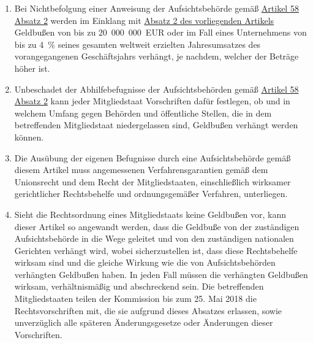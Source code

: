 \begin{enumerate}
\begin{enumerate}
  \end{enumerate}

  \item Bei Nichtbefolgung einer Anweisung der Aufsichtsbehörde gemäß \hyperref[itm:58-2]{Artikel 58 Absatz 2} werden im
   Einklang mit \hyperref[itm:83-2]{Absatz 2 des vorliegenden Artikels} Geldbußen von bis zu 20~000~000~EUR oder im
   Fall eines Unternehmens von bis zu 4~\% seines gesamten weltweit erzielten Jahresumsatzes des vorangegangenen
   Geschäftsjahrs verhängt, je nachdem, welcher der Beträge höher ist.
  \label{itm:83-6}

  \item Unbeschadet der Abhilfebefugnisse der Aufsichtsbehörden gemäß \hyperref[itm:58-2]{Artikel 58 Absatz 2} kann
   jeder Mitgliedstaat Vorschriften dafür festlegen, ob und in welchem Umfang gegen Behörden und öffentliche Stellen,
   die in dem betreffenden Mitgliedstaat niedergelassen sind, Geldbußen verhängt werden können.
  \label{itm:83-7}

  \item Die Ausübung der eigenen Befugnisse durch eine Aufsichtsbehörde gemäß diesem Artikel muss angemessenen
   Verfahrensgarantien gemäß dem Unionsrecht und dem Recht der Mitgliedstaaten, einschließlich wirksamer gerichtlicher
   Rechtsbehelfe und ordnungsgemäßer Verfahren, unterliegen.
  \label{itm:83-8}

  \item Sieht die Rechtsordnung eines Mitgliedstaats keine Geldbußen vor, kann dieser Artikel so angewandt werden, dass
   die Geldbuße von der zuständigen Aufsichtsbehörde in die Wege geleitet und von den zuständigen nationalen Gerichten
   verhängt wird, wobei sicherzustellen ist, dass diese Rechtsbehelfe wirksam sind und die gleiche Wirkung wie die von
   Aufsichtsbehörden verhängten Geldbußen haben. In jeden Fall müssen die verhängten Geldbußen wirksam, verhältnismäßig
   und abschreckend sein. Die betreffenden Mitgliedstaaten teilen der Kommission bis zum 25. Mai 2018 die
   Rechtsvorschriften mit, die sie aufgrund dieses Absatzes erlassen, sowie unverzüglich alle späteren Änderungsgesetze
   oder Änderungen dieser Vorschriften.

\end{enumerate}


